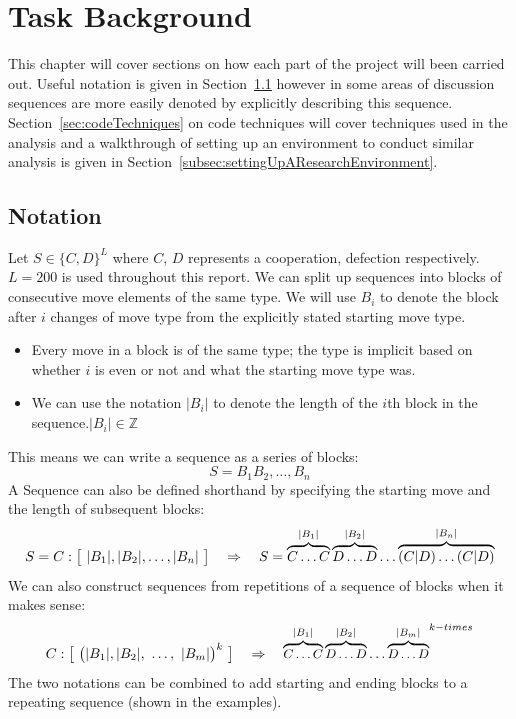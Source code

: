 
\chapter{Task Background}\label{ch:taskBackground}
This chapter will cover sections on how each part of the project will been carried out.
Useful notation is given in Section~\ref{sec:notation} however in some areas of discussion sequences are more easily denoted by explicitly describing this sequence.
Section~\ref{sec:codeTechniques} on code techniques will cover techniques used in the analysis and a walkthrough of setting up an environment to conduct similar analysis is given in Section~\ref{subsec:settingUpAResearchEnvironment}.

\section{Notation}\label{sec:notation}
Let \(S\in\{C, D\}^L\) where \(C\), \(D\) represents a cooperation, defection respectively.\(L=200\) is used throughout this report.
We can split up sequences into blocks of consecutive move elements of the same type.
We will use \(B_i\) to denote the block after \(i\) changes of move type from the explicitly stated starting move type.
\begin{itemize}
    \item Every move in a block is of the same type;
    the type is implicit based on whether \(i\) is even or not and what the starting move type was.
    \item We can use the notation \(|B_i|\) to denote the length of the \(i\)th block in the sequence.\(|B_i| \in \mathbb{Z}\)
\end{itemize}

This means we can write a sequence as a series of blocks:
\[S= B_1 B_2,\ldots,B_n\]
A Sequence can also be defined shorthand by specifying the starting move and the length of subsequent blocks:
\[S = C:\big{[}\ |B_1|,|B_2|,\ldots,|B_n|\ \big{]} \quad \Rightarrow \quad S=\overbrace{C\ldots C}^{|B_1|}\overbrace{D\ldots D}^{|B_2|}\ldots\overbrace{(C|D)\ldots (C|D)}^{|B_n|} \]
We can also construct sequences from repetitions of a sequence of blocks when it makes sense:
\[C:\big{[}\ \big{(}|B_1|,|B_2|,\ \ldots,\ |B_m|\big{)}^{k}\ \big{]} \quad \Rightarrow \quad {\small{\overbrace{C\ldots C}^{|B_1|}\overbrace{D\ldots D}^{|B_2|}\ldots\overbrace{D\ldots D}^{|B_m|}}}^{k-times}\]
The two notations can be combined to add starting and ending blocks to a repeating sequence (shown in the examples).\\

